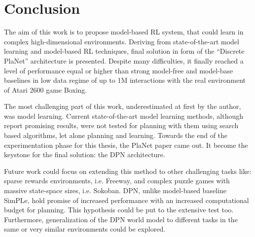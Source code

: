 \section{Conclusion}

The aim of this work is to propose model-based RL system, that could learn in complex high-dimensional environments. Deriving from state-of-the-art model learning \cite{Algo.RecurrentEnvSim}\cite{Algo.JointFrameRewardPrediction}\cite{Algo.FastGenerativeModels} and model-based RL \cite{Algo.SimPLe}\cite{Algo.VPN}\cite{Algo.WorldModels}\cite{Algo.PlaNet} techniques, final solution in form of the ``Discrete PlaNet'' architecture is presented. Despite many difficulties, it finally reached a level of performance equal or higher than strong model-free and model-base baselines in low data regime of up to 1M interactions with the real environment of Atari 2600 game Boxing.

The most challenging part of this work, underestimated at first by the author, was model learning. Current state-of-the-art model learning methods, although report promising results, were not tested for planning with them using search based algorithms, let alone planning and learning. Towards the end of the experimentation phase for this thesis, the PlaNet paper came out. It become the keystone for the final solution: the DPN architecture.

Future work could focus on extending this method to other challenging tasks like: sparse rewards environments, i.e. Freeway, and complex puzzle games with massive state-space sizes, i.e. Sokoban.
DPN, unlike model-based baseline SimPLe, hold promise of increased performance with an increased computational budget for planning. This hypothesis could be put to the extensive test too.
Furthermore, generalization of the DPN world model to different tasks in the same or very similar environments could be explored.
